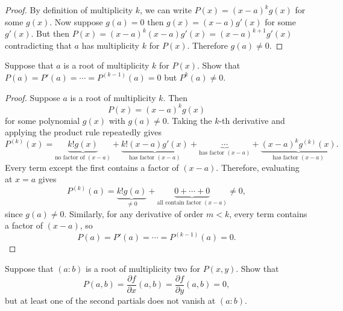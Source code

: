 \begin{proof}
    By definition of multiplicity $k$, we can write $P(x) = (x - a)^k g(x)$ for some $g(x)$.
    Now suppose $g(a) = 0$ then $g(x) = (x - a)g'(x)$ for some $g'(x)$.
    But then $P(x) = (x - a)^k (x - a)g'(x) = (x - a)^{k + 1} g'(x)$ contradicting 
    that $a$ has multiplicity $k$ for $P(x)$.
    Therefore $g(a) \ne 0$.
\end{proof}


\begin{tcolorbox}[title=Problem 6, breakable]
    Suppose that $a$ is a root of multiplicity $k$ for $P(x)$.
    Show that $P(a) = P'(a) = \cdots = P^{(k - 1)}(a) = 0$ but $P^k(a) \ne 0$.
\end{tcolorbox}

\begin{proof}
    Suppose $a$ is a root of multiplicity $k$. Then
    \[
    P(x) = (x-a)^k g(x)
    \]
    for some polynomial $g(x)$ with $g(a) \ne 0$.
    Taking the $k$-th derivative and applying the product rule repeatedly gives
    \[
    P^{(k)}(x)
    =
    \underbrace{k! g(x)}_{\text{no factor of }(x-a)}
    +
    \underbrace{k! (x-a) g'(x)}_{\text{has factor }(x-a)}
    +
    \underbrace{\cdots}_{\text{has factor }(x-a)}
    +
    \underbrace{(x-a)^k g^{(k)}(x)}_{\text{has factor }(x-a)}.
    \]
    Every term except the first contains a factor of $(x-a)$. Therefore, evaluating at $x=a$ gives
    \[
    P^{(k)}(a)
    =
    \underbrace{k! g(a)}_{\ne 0}
    +
    \underbrace{0 + \cdots + 0}_{\text{all contain factor }(x-a)}
    \ne 0,
    \]
    since $g(a) \ne 0$.
    Similarly, for any derivative of order $m < k$, every term contains a factor of $(x-a)$, so
    \[
    P(a) = P'(a) = \cdots = P^{(k-1)}(a) = 0.
    \]
\end{proof}


\begin{tcolorbox}[title=Problem 7, breakable]
    Suppose that $(a : b)$ is a root of multiplicity two for $P(x, y)$.
    Show that 
    \[P(a, b) = \frac{\partial f}{\partial x}(a,b) = \frac{\partial f}{\partial y}(a, b) = 0,\]
    but at least one of the second partials does not vanish at $(a : b)$.
\end{tcolorbox}

